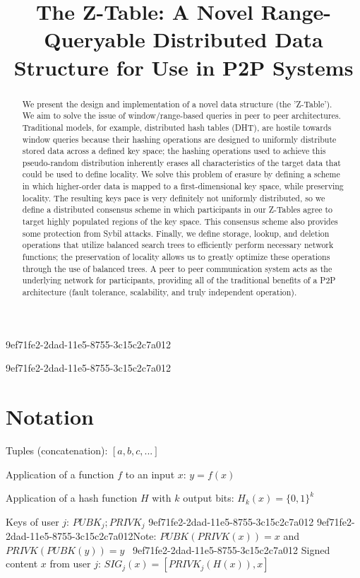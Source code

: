 \documentclass[12pt]{article}
\title{The Z-Table: A Novel Range-Queryable Distributed Data Structure for Use in P2P Systems}
\begin{document}
\maketitle
9ef71fe2-2dad-11e5-8755-3c15c2c7a012
\begin{abstract}
We present the design and implementation of a novel data structure (the 'Z-Table'). We aim to solve the issue of window/range-based queries in peer to peer architectures. Traditional models, for example,  distributed hash tables (DHT), are hostile towards window queries because their hashing operations are designed to uniformly distribute stored data across a defined key space; the hashing operations used to achieve this pseudo-random distribution inherently erases all characteristics of the target data that could be used to define locality. We solve this problem of erasure by defining a scheme in which higher-order data is mapped to a first-dimensional key space, while preserving locality. The resulting keys pace is very definitely not uniformly distributed, so we define a distributed consensus scheme in which participants in our Z-Tables agree to target highly populated regions of the key space. This consensus scheme also provides some protection from Sybil attacks. Finally, we define storage, lookup, and deletion operations that utilize balanced search trees to efficiently perform necessary network functions; the preservation of locality allows us to greatly optimize these operations through the use of balanced trees. A peer to peer communication system acts as the underlying network for participants, providing all of the traditional benefits of a P2P architecture (fault tolerance, scalability, and truly independent operation).
\end{abstract}

9ef71fe2-2dad-11e5-8755-3c15c2c7a012\section{Notation}

Tuples (concatenation): $[a,b,c,...]$

Application of a function $f$ to an input $x$: $y=f(x)$

Application of a hash function $H$ with $k$ output bits: $H_{k}(x) = \{0,1\}^k$

Keys of user $j$: $ PUBK_j; PRIVK_j $
9ef71fe2-2dad-11e5-8755-3c15c2c7a012
9ef71fe2-2dad-11e5-8755-3c15c2c7a012Note: $PUBK(PRIVK(x)) = x$ and $PRIVK(PUBK(y)) = y$~
9ef71fe2-2dad-11e5-8755-3c15c2c7a012
Signed content $x$ from user $j$: $SIG_j(x) = \left[ PRIVK_j( H(x) ), x \right]$
\end{document}
